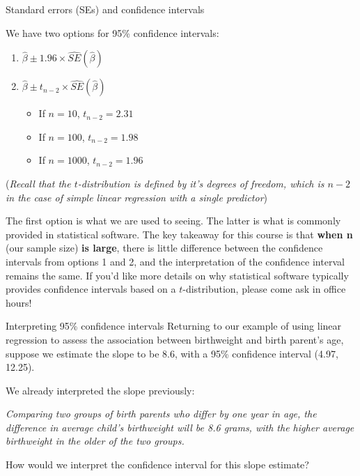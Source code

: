 \documentclass[10pt,t]{beamer}
\begin{document}
\begin{frame}{Standard errors (SEs) and confidence intervals}

We have two options for 95\% confidence intervals:
\begin{enumerate}
	\item $\hat{\beta} \pm 1.96 \times \hat{SE}(\hat{\beta})$
	\item $\hat{\beta} \pm t_{n-2} \times \hat{SE}(\hat{\beta})$
	\begin{itemize}
		\item If $n = 10$, $t_{n-2} = 2.31$
		\item If $n = 100$, $t_{n-2} = 1.98$
		\item If $n = 1000$, $t_{n-2} = 1.96$
	\end{itemize}
\end{enumerate}

\small (\textit{Recall that the $t$-distribution is defined by it's \textit{degrees of freedom}, which is $n-2$ in the case of simple linear regression with a single predictor})

\vspace{0.3cm}

\normalsize The first option is what we are used to seeing. The latter is what is commonly provided in statistical software. The key takeaway for this course is that \textbf{when n} (our sample size) \textbf{is large}, there is little difference between the confidence intervals from options 1 and 2, and the interpretation of the confidence interval remains the same. If you'd like more details on why statistical software typically provides confidence intervals based on a $t$-distribution, please come ask in office hours!

\end{frame}

\begin{frame}{Interpreting 95\% confidence intervals}
Returning to our example of using linear regression to assess the association between birthweight and birth parent's age, suppose we estimate the slope to be 8.6, with a 95\% confidence interval (4.97, 12.25).

\vspace{0.3cm}

We already interpreted the slope previously:

\vspace{0.3cm}

\textit{Comparing two groups of birth parents who differ by one year in age, the difference in average child's birthweight will be 8.6 grams, with the higher average birthweight in the older of the two groups.}

\vspace{0.3cm}

How would we interpret the confidence interval for this slope estimate? %

\end{frame}
\end{document}
